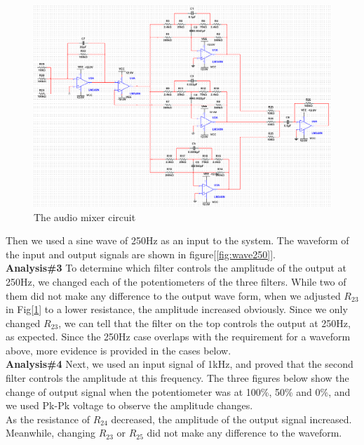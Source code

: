 \begin{figure}[!htbp]
	\centering
	\begin{framed}
		\includegraphics[width=\linewidth]{images/circ2.png}
		\caption{The audio mixer circuit}
		\label{fig:fullcir}
	\end{framed}
\end{figure}
\phantom{ } Then we used a sine wave of 250Hz as an input to the system. The waveform of the input and output signals are shown in figure[\ref{fig:wave250}].\\
\hfill \newline
\textbf{Analysis\#3} \newline
\phantom{ } To determine which filter controls the amplitude of the output at 250Hz, we changed each of the potentiometers of the three filters. While two of them did not make any difference to the output wave form, when we adjusted $R_{23}$ in Fig[\ref{fig:fullcir}] to a lower resistance, the amplitude increased obviously. Since we only changed $R_{23}$, we can tell that the filter on the top controls the output at 250Hz, as expected. Since the 250Hz case overlaps with the requirement for a waveform above, more evidence is provided in the cases below.\\
\hfill \newline
\textbf{Analysis\#4} \newline
\phantom{ } Next, we used an input signal of 1kHz, and proved that the second filter controls the amplitude at this frequency. The three figures below show the change of output signal when the potentiometer was at 100\%, 50\% and 0\%, and we used Pk-Pk voltage to observe the amplitude changes. \\
\phantom{ } As the resistance of $R_{24}$ decreased, the amplitude of the output signal increased. Meanwhile, changing $R_{23}$ or $R_{25}$ did not make any difference to the waveform.\\
